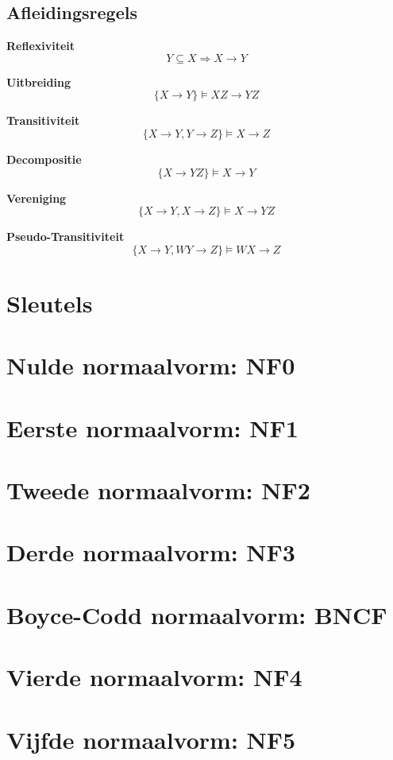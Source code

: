 \documentclass[normaalvormen.tex]{subfiles}
\begin{document}
\subsection{Afleidingsregels}
\begin{reg} \textbf{Reflexiviteit}
\[
Y \subseteq X \Rightarrow X \rightarrow Y
\]
\end{reg}
\begin{reg} \textbf{Uitbreiding}
\[
\{X \rightarrow Y\} \models XZ \rightarrow YZ
\]
\end{reg}
\begin{reg} \textbf{Transitiviteit}
\[
\{X \rightarrow Y, Y \rightarrow Z\} \models X \rightarrow Z
\]
\end{reg} 
\begin{reg}\textbf{Decompositie}
\[
\{X \rightarrow YZ\} \models X \rightarrow Y
\]
\end{reg}
\begin{reg} \textbf{Vereniging}
\[
\{X\rightarrow Y, X\rightarrow Z \} \models X\rightarrow YZ
\]
\end{reg}
\begin{reg} \textbf{Pseudo-Transitiviteit}
\[
\{ X\rightarrow Y, WY \rightarrow Z \} \models WX\rightarrow Z
\]
\end{reg}


\section{Sleutels}

\section{Nulde normaalvorm: NF0}
\section{Eerste normaalvorm: NF1}
\section{Tweede normaalvorm: NF2}
\section{Derde normaalvorm: NF3}
\section{Boyce-Codd normaalvorm: BNCF}
\section{Vierde normaalvorm: NF4}
\section{Vijfde normaalvorm: NF5}
\end{document}
